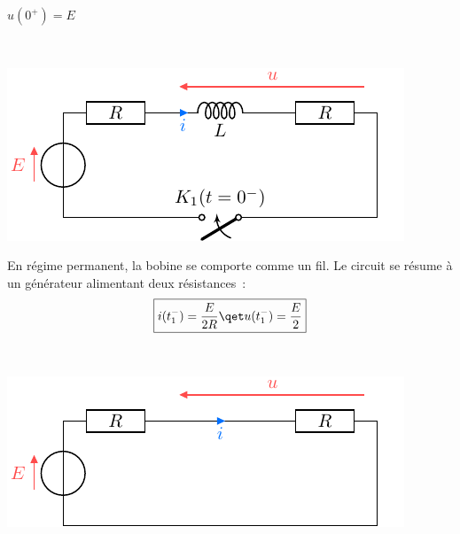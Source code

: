 \documentclass[a4paper, 10pt, garamond, oneside]{book}
\begin{document}
{\begin{enumerate}
\begin{minipage}[t]{.49\linewidth}
            $\boxed{u(0^+)=E}$
		      \end{minipage}
		      \hfill
		      \begin{minipage}[t]{.49\linewidth}
			      ~
            \vspace{-20pt}
			      \begin{center}
				      \includegraphics[width=\linewidth]{transRL_q1}
			      \end{center}
		      \end{minipage}
          \vspace{10pt}
     \label{Q:perm1}\noindent
		      \begin{minipage}[t]{.49\linewidth}
			      En régime permanent, la bobine se comporte comme un fil. Le
            circuit se résume à un générateur alimentant deux résistances~:
            \[
              \boxed{
                i(t_1^-)=\frac{E}{2R}
                \qet
                u(t_1^-)=\frac{E}{2}
              }
            \]
		      \end{minipage}
		      \hfill
		      \begin{minipage}[t]{.49\linewidth}
			      ~
            \vspace{-30pt}
			      \begin{center}
				      \includegraphics[width=\linewidth]{transRL_q2}
			      \end{center}

\end{minipage}
\end{enumerate}}
\end{document}
